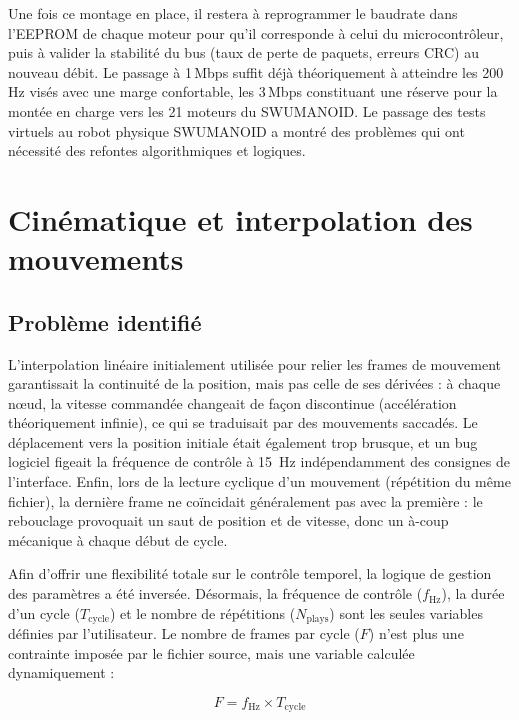 \documentclass{tropLaClasse}
\begin{document}
Une fois ce montage en place, il restera à reprogrammer le baudrate dans l'EEPROM de chaque moteur pour qu'il corresponde à celui du microcontrôleur, puis à valider la stabilité du bus (taux de perte de paquets, erreurs CRC) au nouveau débit. Le passage à 1\,Mbps suffit déjà théoriquement à atteindre les 200\,Hz visés avec une marge confortable, les 3\,Mbps constituant une réserve pour la montée en charge vers les 21 moteurs du SWUMANOID. Le passage des tests virtuels au robot physique SWUMANOID a montré des problèmes qui ont nécessité des refontes algorithmiques et logiques.



\section{Cinématique et interpolation des mouvements}

\subsection{Problème identifié} 

L'interpolation linéaire initialement utilisée pour relier les frames de mouvement garantissait la continuité de la position, mais pas celle de ses dérivées : à chaque nœud, la vitesse commandée changeait de façon discontinue (accélération théoriquement infinie), ce qui se traduisait par des mouvements saccadés. Le déplacement vers la position initiale était également trop brusque, et un bug logiciel figeait la fréquence de contrôle à 15~Hz indépendamment des consignes de l'interface. Enfin, lors de la lecture cyclique d'un mouvement (répétition du même fichier), la dernière frame ne coïncidait généralement pas avec la première : le rebouclage provoquait un saut de position et de vitesse, donc un à-coup mécanique à chaque début de cycle.

Afin d'offrir une flexibilité totale sur le contrôle temporel, la logique de gestion des paramètres a été inversée. Désormais, la fréquence de contrôle ($f_{\mathrm{Hz}}$), la durée d'un cycle ($T_{\mathrm{cycle}}$) et le nombre de répétitions ($N_{\mathrm{plays}}$) sont les seules variables définies par l'utilisateur. Le nombre de frames par cycle ($F$) n'est plus une contrainte imposée par le fichier source, mais une variable calculée dynamiquement :

\begin{equation}
    F = f_{\mathrm{Hz}} \times T_{\mathrm{cycle}}
\end{equation}
\end{document}
